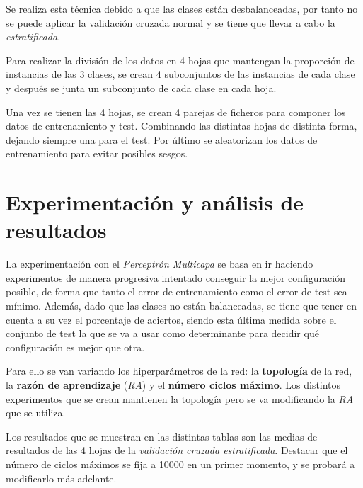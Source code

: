 \documentclass{uc3mpracticas}
\begin{document}
Se realiza esta técnica debido a que las clases están desbalanceadas, por tanto no se puede aplicar la validación cruzada normal y se tiene que llevar a cabo la \textit{estratificada}.

\vspace{2mm}

Para realizar la división de los datos en 4 hojas que mantengan la proporción de instancias de las 3 clases, se crean 4 subconjuntos de las instancias de cada clase y después se junta un subconjunto de cada clase en cada hoja.

\vspace{2mm}

Una vez se tienen las 4 hojas, se crean 4 parejas de ficheros para componer los datos de entrenamiento y test. Combinando las distintas hojas de distinta forma, dejando siempre una para el test. Por último se aleatorizan los datos de entrenamiento para evitar posibles sesgos.



\section{Experimentación y análisis de resultados}

La experimentación con el \textit{Perceptrón Multicapa} se basa en ir haciendo experimentos de manera progresiva intentado conseguir la mejor configuración posible, de forma que tanto el error de entrenamiento como el error de test sea mínimo. Además, dado que las clases no están balanceadas, se tiene que tener en cuenta a su vez el porcentaje de aciertos, siendo esta última medida sobre el conjunto de test la que se va a usar como determinante para decidir qué configuración es mejor que otra.

\vspace{2mm}

 Para ello se van variando los hiperparámetros de la red: la \textbf{topología} de la red, la \textbf{razón de aprendizaje} (\textit{RA}) y el \textbf{número ciclos máximo}. Los distintos experimentos que se crean mantienen la topología pero se va modificando la \textit{RA} que se utiliza.

\vspace{1mm}

Los resultados que se muestran en las distintas tablas son las medias de resultados de las 4 hojas de la \textit{validación cruzada estratificada}. Destacar que el número de ciclos máximos se fija a 10000 en un primer momento, y se probará a modificarlo más adelante.
\end{document}
